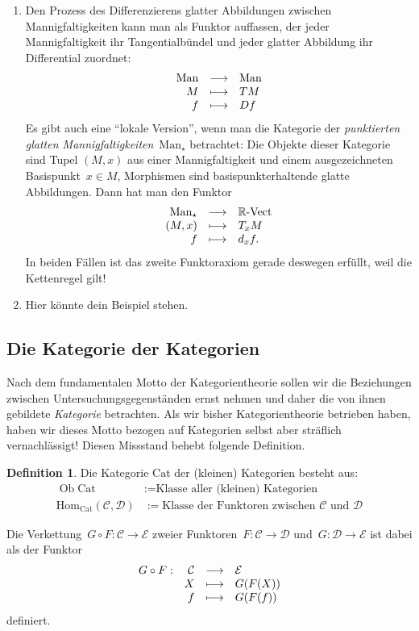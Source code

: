 \documentclass[a4paper,ngerman]{scrartcl}
\theoremstyle{definition}
\newtheorem{defn}{Definition}[section]
\theoremstyle{plain}
\theoremstyle{remark}
\newcommand{\RR}{\mathbb{R}}
\newcommand{\C}{\mathcal{C}}
\newcommand{\D}{\mathcal{D}}
\newcommand{\E}{\mathcal{E}}
\newcommand{\Hom}{\mathrm{Hom}}
\DeclareMathOperator{\Ob}{Ob}
\newcommand{\Vect}{\mathrm{Vect}}
\newcommand{\Cat}{\mathrm{Cat}}
\newcommand{\Man}{\mathrm{Man}}
\begin{document}
\begin{enumerate}
\item Den Prozess des Differenzierens glatter Abbildungen zwischen
Mannigfaltigkeiten kann man als Funktor auffassen, der jeder Mannigfaltigkeit
ihr Tangentialbündel und jeder glatter Abbildung ihr Differential zuordnet:
\[ \begin{array}{@{}rcl@{}}
  \Man &\longrightarrow& \Man \\
  M &\longmapsto& TM \\
  f &\longmapsto& Df
\end{array} \]
Es gibt auch eine "`lokale Version"', wenn man die Kategorie der
\emph{punktierten glatten Mannigfaltigkeiten}~$\Man_\star$ betrachtet: Die
Objekte dieser Kategorie sind Tupel $(M,x)$ aus einer Mannigfaltigkeit und
einem ausgezeichneten Basispunkt~$x \in M$, Morphismen sind
basispunkterhaltende glatte Abbildungen. Dann hat man den Funktor
\[ \begin{array}{@{}rcl@{}}
  \Man_\star &\longrightarrow& \RR\text{-}\Vect \\
  (M,x) &\longmapsto& T_x M \\
  f &\longmapsto& d_x f.
\end{array} \]
In beiden Fällen ist das zweite Funktoraxiom gerade deswegen erfüllt, weil die
Kettenregel gilt!

\item Hier könnte dein Beispiel stehen.
\end{enumerate}


\subsection{Die Kategorie der Kategorien}

Nach dem fundamentalen Motto der Kategorientheorie sollen wir die Beziehungen
zwischen Untersuchungsgegenständen ernst nehmen und daher die von ihnen
gebildete \emph{Kategorie} betrachten. Als wir bisher Kategorientheorie
betrieben haben, haben wir dieses Motto bezogen auf Kategorien selbst aber
sträflich vernachlässigt! Diesen Missstand behebt folgende Definition.
\begin{defn}
Die Kategorie $\Cat$ der (kleinen) Kategorien besteht aus:
\begin{align*}
  \Ob \Cat &:= \text{Klasse aller (kleinen) Kategorien} \\
  \Hom_\Cat(\C,\mathcal{D}) &:= \text{Klasse der Funktoren zwischen $\C$ und $\mathcal{D}$}
\end{align*}
\end{defn}
Die Verkettung~$G \circ F : \C \to \E$ zweier Funktoren~$F : \C \to \D$ und~$G
: \D \to \E$ ist dabei als der Funktor
\[ \begin{array}{@{}rrcl@{}}
  G \circ F: & \C &\longrightarrow& \E \\
  & X &\longmapsto& G(F(X)) \\
  & f &\longmapsto& G(F(f))
\end{array} \]
definiert.
\end{document}

